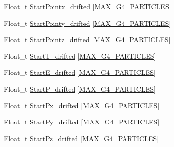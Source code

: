 \begin{DoxyCompactItemize}
\item 
Float\-\_\-t \hyperlink{classanatree_a9e41c51e5868649eb19b24de07640f9d}{Start\-Pointx\-\_\-drifted} \mbox{[}\hyperlink{anatree__core__v09410002__orig_8h_aa5cbba5cc53c011e88805f38503de894}{M\-A\-X\-\_\-\-G4\-\_\-\-P\-A\-R\-T\-I\-C\-L\-E\-S}\mbox{]}
\item 
Float\-\_\-t \hyperlink{classanatree_a79ef86416f1ee4bacad0b4e007311d27}{Start\-Pointy\-\_\-drifted} \mbox{[}\hyperlink{anatree__core__v09410002__orig_8h_aa5cbba5cc53c011e88805f38503de894}{M\-A\-X\-\_\-\-G4\-\_\-\-P\-A\-R\-T\-I\-C\-L\-E\-S}\mbox{]}
\item 
Float\-\_\-t \hyperlink{classanatree_a6a10be4f89bfbfff86e9f5d61d58725d}{Start\-Pointz\-\_\-drifted} \mbox{[}\hyperlink{anatree__core__v09410002__orig_8h_aa5cbba5cc53c011e88805f38503de894}{M\-A\-X\-\_\-\-G4\-\_\-\-P\-A\-R\-T\-I\-C\-L\-E\-S}\mbox{]}
\item 
Float\-\_\-t \hyperlink{classanatree_ad61483d1a304b519dd3c5a0ddd601939}{Start\-T\-\_\-drifted} \mbox{[}\hyperlink{anatree__core__v09410002__orig_8h_aa5cbba5cc53c011e88805f38503de894}{M\-A\-X\-\_\-\-G4\-\_\-\-P\-A\-R\-T\-I\-C\-L\-E\-S}\mbox{]}
\item 
Float\-\_\-t \hyperlink{classanatree_a3336eb8232966f8e21de7f4e99e910ec}{Start\-E\-\_\-drifted} \mbox{[}\hyperlink{anatree__core__v09410002__orig_8h_aa5cbba5cc53c011e88805f38503de894}{M\-A\-X\-\_\-\-G4\-\_\-\-P\-A\-R\-T\-I\-C\-L\-E\-S}\mbox{]}
\item 
Float\-\_\-t \hyperlink{classanatree_a95e77cfd37a96804f7d6622ed4405014}{Start\-P\-\_\-drifted} \mbox{[}\hyperlink{anatree__core__v09410002__orig_8h_aa5cbba5cc53c011e88805f38503de894}{M\-A\-X\-\_\-\-G4\-\_\-\-P\-A\-R\-T\-I\-C\-L\-E\-S}\mbox{]}
\item 
Float\-\_\-t \hyperlink{classanatree_aa7bb55560acb91e78a207e03ff517031}{Start\-Px\-\_\-drifted} \mbox{[}\hyperlink{anatree__core__v09410002__orig_8h_aa5cbba5cc53c011e88805f38503de894}{M\-A\-X\-\_\-\-G4\-\_\-\-P\-A\-R\-T\-I\-C\-L\-E\-S}\mbox{]}
\item 
Float\-\_\-t \hyperlink{classanatree_ae98044c9b034d639ad6b8719779d0d01}{Start\-Py\-\_\-drifted} \mbox{[}\hyperlink{anatree__core__v09410002__orig_8h_aa5cbba5cc53c011e88805f38503de894}{M\-A\-X\-\_\-\-G4\-\_\-\-P\-A\-R\-T\-I\-C\-L\-E\-S}\mbox{]}
\item 
Float\-\_\-t \hyperlink{classanatree_ad1ca1198cef0185db648581298be8d18}{Start\-Pz\-\_\-drifted} \mbox{[}\hyperlink{anatree__core__v09410002__orig_8h_aa5cbba5cc53c011e88805f38503de894}{M\-A\-X\-\_\-\-G4\-\_\-\-P\-A\-R\-T\-I\-C\-L\-E\-S}\mbox{]}

\end{DoxyCompactItemize}

